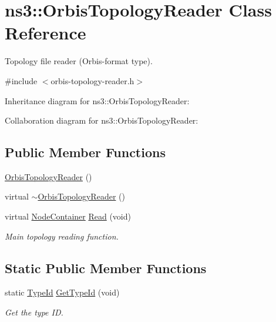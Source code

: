 \hypertarget{classns3_1_1OrbisTopologyReader}{}\section{ns3\+:\+:Orbis\+Topology\+Reader Class Reference}
\label{classns3_1_1OrbisTopologyReader}


Topology file reader (Orbis-\/format type).  




{\ttfamily \#include $<$orbis-\/topology-\/reader.\+h$>$}



Inheritance diagram for ns3\+:\+:Orbis\+Topology\+Reader\+:


Collaboration diagram for ns3\+:\+:Orbis\+Topology\+Reader\+:
\subsection*{Public Member Functions}
\begin{DoxyCompactItemize}
\item 
\hyperlink{classns3_1_1OrbisTopologyReader_a7f43791c6f18448980091ec3a1e206bc}{Orbis\+Topology\+Reader} ()
\item 
virtual \hyperlink{classns3_1_1OrbisTopologyReader_af585673f689fdc13e9d52ca3e7dbeb2f}{$\sim$\+Orbis\+Topology\+Reader} ()
\item 
virtual \hyperlink{classns3_1_1NodeContainer}{Node\+Container} \hyperlink{classns3_1_1OrbisTopologyReader_afcf2cc29dc07e5a787a63e2a6e807a1a}{Read} (void)
\begin{DoxyCompactList}\small\item\em Main topology reading function. \end{DoxyCompactList}\end{DoxyCompactItemize}
\subsection*{Static Public Member Functions}
\begin{DoxyCompactItemize}
\item 
static \hyperlink{classns3_1_1TypeId}{Type\+Id} \hyperlink{classns3_1_1OrbisTopologyReader_a0aa70f129ce971c8d67487e1518a84e1}{Get\+Type\+Id} (void)
\begin{DoxyCompactList}\small\item\em Get the type ID. \end{DoxyCompactList}\end{DoxyCompactItemize}
